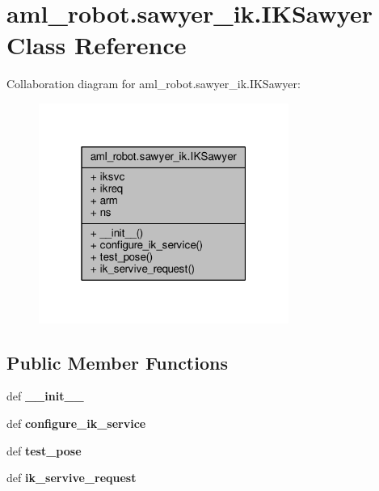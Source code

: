 \hypertarget{classaml__robot_1_1sawyer__ik_1_1_i_k_sawyer}{\section{aml\-\_\-robot.\-sawyer\-\_\-ik.\-I\-K\-Sawyer Class Reference}
\label{classaml__robot_1_1sawyer__ik_1_1_i_k_sawyer}
}


Collaboration diagram for aml\-\_\-robot.\-sawyer\-\_\-ik.\-I\-K\-Sawyer\-:
\nopagebreak
\begin{figure}[H]
\begin{center}
\leavevmode
\includegraphics[width=232pt]{classaml__robot_1_1sawyer__ik_1_1_i_k_sawyer__coll__graph}
\end{center}
\end{figure}
\subsection*{Public Member Functions}
\begin{DoxyCompactItemize}
\item 
\hypertarget{classaml__robot_1_1sawyer__ik_1_1_i_k_sawyer_a65178d63636b88d3d2e408e935c99942}{def {\bfseries \-\_\-\-\_\-init\-\_\-\-\_\-}}\label{classaml__robot_1_1sawyer__ik_1_1_i_k_sawyer_a65178d63636b88d3d2e408e935c99942}

\item 
\hypertarget{classaml__robot_1_1sawyer__ik_1_1_i_k_sawyer_a00d497c052f10e0aa35725d2f3b10011}{def {\bfseries configure\-\_\-ik\-\_\-service}}\label{classaml__robot_1_1sawyer__ik_1_1_i_k_sawyer_a00d497c052f10e0aa35725d2f3b10011}

\item 
\hypertarget{classaml__robot_1_1sawyer__ik_1_1_i_k_sawyer_a979a1ec545060a095c80780032d9e357}{def {\bfseries test\-\_\-pose}}\label{classaml__robot_1_1sawyer__ik_1_1_i_k_sawyer_a979a1ec545060a095c80780032d9e357}

\item 
\hypertarget{classaml__robot_1_1sawyer__ik_1_1_i_k_sawyer_af43ddd8058cd9aa509e1f9d35162bc65}{def {\bfseries ik\-\_\-servive\-\_\-request}}\label{classaml__robot_1_1sawyer__ik_1_1_i_k_sawyer_af43ddd8058cd9aa509e1f9d35162bc65}

\end{DoxyCompactItemize}
